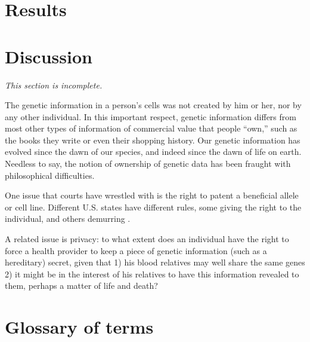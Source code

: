 \documentclass{article}
\begin{document}
\section{Results}
\label{results}

\section{Discussion}
\label{discussion}
{\em This section is incomplete.}

The genetic information in a person's cells was not created by him or her, nor by any other individual. In this important respect, genetic information differs from most other types of information of commercial value that people ``own,'' such as the books they write or even their shopping history. Our genetic information has evolved since the dawn of our species, and indeed since the dawn of life on earth. Needless to say, the notion of ownership of genetic data has been fraught with philosophical difficulties.

One issue that courts have wrestled with is the right to patent a beneficial allele or cell line. Different U.S. states have different rules, some giving the right to the individual, and others demurring \cite{john-moore-who-owns-your-genetic-information}.

A related issue is  privacy: to what extent does an individual have the right to force a health provider to keep a piece of genetic information (such as a hereditary) secret, given that 1) his blood relatives may well share the same genes 2) it might be in the interest of his relatives to have this information revealed to them, perhaps a matter of life and death?


\section{Glossary of terms}


\end{document}
